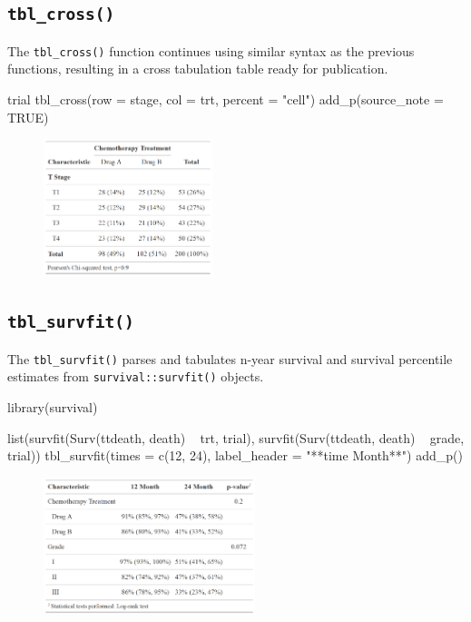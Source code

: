 \subsection{\texorpdfstring{\texttt{tbl\_cross()}}{tbl\_cross()}}

The \texttt{tbl\_cross()} function continues using similar syntax as the previous functions, resulting in a cross tabulation table ready for publication. 

\begin{example}
trial %
  tbl_cross(row = stage, col = trt, percent = "cell") %
  add_p(source_note = TRUE)
\end{example}
\begin{figure}[h!]
  \includegraphics[height=4cm]{cross.png}
  \centering
\end{figure}

\subsection{\texorpdfstring{\texttt{tbl\_survfit()}}{tbl\_survfit()}}

The \texttt{tbl\_survfit()} parses and tabulates n-year survival and survival percentile estimates from \texttt{survival::survfit()} objects.

\begin{example}
library(survival)

list(survfit(Surv(ttdeath, death) ~ trt, trial),
     survfit(Surv(ttdeath, death) ~ grade, trial)) %
  tbl_survfit(times = c(12, 24),
              label_header = "**{time} Month**") %
  add_p()
\end{example}

\begin{figure}[h!]
  \includegraphics[height=4cm]{survfit.png}
  \centering
\end{figure}

